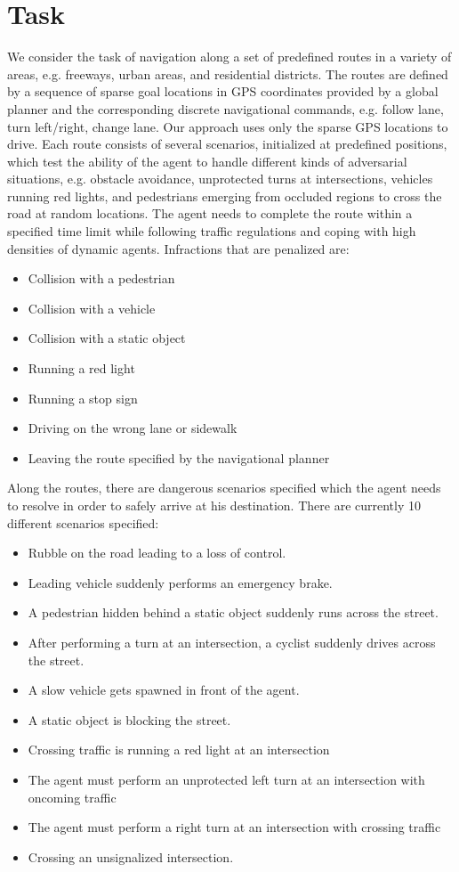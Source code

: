 \documentclass[12pt, letterpaper,cleardoubleempty,BCOR1cm]{scrbook}
\begin{document}
\section{Task}
\label{sec:org71cbfd7}
We consider the task of navigation along a set of predefined routes in a variety
of areas, e.g. freeways, urban areas, and residential districts. The routes are
defined by a sequence of sparse goal locations in GPS coordinates provided by a
global planner and the corresponding discrete navigational commands, e.g. follow
lane, turn left/right, change lane. Our approach uses only the sparse GPS
locations to drive. Each route consists of several scenarios, initialized at
predefined positions, which test the ability of the agent to handle different
kinds of adversarial situations, e.g. obstacle avoidance, unprotected turns at
intersections, vehicles running red lights, and pedestrians emerging from
occluded regions to cross the road at random locations. The agent needs to
complete the route within a specified time limit while following traffic
regulations and coping with high densities of dynamic agents. Infractions that
are penalized are:
\begin{itemize}
\item Collision with a pedestrian
\item Collision with a vehicle
\item Collision with a static object
\item Running a red light
\item Running a stop sign
\item Driving on the wrong lane or sidewalk
\item Leaving the route specified by the navigational planner
\end{itemize}
Along the routes, there are dangerous scenarios specified which the agent needs to
resolve in order to safely arrive at his destination. There are currently 10 different
scenarios specified:
\begin{itemize}
\item Rubble on the road leading to a loss of control.
\item Leading vehicle suddenly performs an emergency brake.
\item A pedestrian hidden behind a static object suddenly runs across the street.
\item After performing a turn at an intersection, a cyclist suddenly drives across
the street.
\item A slow vehicle gets spawned in front of the agent.
\item A static object is blocking the street.
\item Crossing traffic is running a red light at an intersection
\item The agent must perform an unprotected left turn at an intersection with oncoming traffic
\item The agent must perform a right turn at an intersection with crossing traffic
\item Crossing an unsignalized intersection.
\end{itemize}
\end{document}
